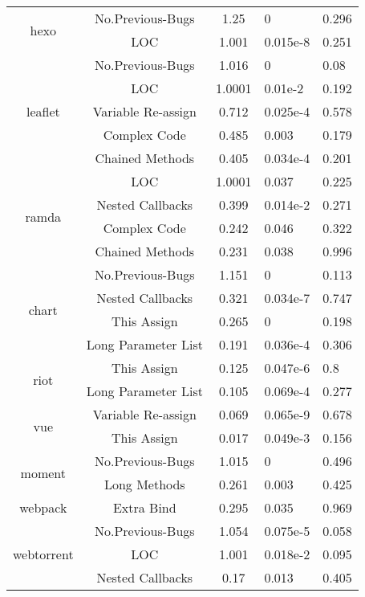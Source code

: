 \begin{table}[t]
\begin{tabular}{c|c|c|p{1.1cm}|p{1.3cm}}
		\multirow{2}{*}{hexo}
		& No.Previous-Bugs & 1.25 & 0 & 0.296 \\ \cline{2-5}
		& LOC & 1.001 & 0.015e-8 & 0.251 \\ \hline
		\multirow{5}{*}{leaflet}
		& No.Previous-Bugs & 1.016 & 0 & 0.08 \\ \cline{2-5}
		& LOC & 1.0001 & 0.01e-2 & 0.192 \\ \cline{2-5}
		& Variable Re-assign & 0.712 & 0.025e-4 & 0.578 \\ \cline{2-5}
		& Complex Code & 0.485 & 0.003 & 0.179 \\ \cline{2-5}
		& Chained Methods & 0.405 & 0.034e-4 & 0.201 \\ \hline
		\multirow{4}{*}{ramda}
		& LOC & 1.0001 & 0.037 & 0.225 \\ \cline{2-5}
		& Nested Callbacks & 0.399 & 0.014e-2 & 0.271 \\ \cline{2-5}
		& Complex Code & 0.242 & 0.046 & 0.322 \\ \cline{2-5}
		& Chained Methods & 0.231 & 0.038 & 0.996 \\ \hline
		\multirow{4}{*}{chart}
		& No.Previous-Bugs & 1.151 & 0 & 0.113 \\ \cline{2-5}
		& Nested Callbacks & 0.321 & 0.034e-7 & 0.747 \\ \cline{2-5}
		& This Assign & 0.265 & 0 & 0.198 \\ \cline{2-5}
		& Long Parameter List & 0.191 & 0.036e-4 & 0.306 \\ \hline
		\multirow{2}{*}{riot}
		& This Assign & 0.125 & 0.047e-6 & 0.8 \\ \cline{2-5}
		& Long Parameter List & 0.105 & 0.069e-4 & 0.277 \\ \hline
		\multirow{2}{*}{vue}
		& Variable Re-assign & 0.069 & 0.065e-9 & 0.678 \\ \cline{2-5}
		& This Assign & 0.017 & 0.049e-3 & 0.156 \\ \hline
		\multirow{2}{*}{moment}
		& No.Previous-Bugs & 1.015 & 0 & 0.496 \\ \cline{2-5}
		& Long Methods & 0.261 & 0.003 & 0.425 \\ \hline
		\multirow{1}{*}{webpack}
		& Extra Bind & 0.295 & 0.035 & 0.969 \\ \hline
		\multirow{3}{*}{webtorrent}
		& No.Previous-Bugs & 1.054 & 0.075e-5 & 0.058 \\ \cline{2-5}
		& LOC & 1.001 & 0.018e-2 & 0.095 \\ \cline{2-5}
		& Nested Callbacks & 0.17 & 0.013 & 0.405 \\ \hline
	\end{tabular}
	\label{smelltypes}
	\vspace{-15pt}
\end{table}

